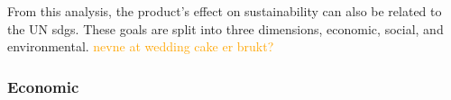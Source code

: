 From this analysis, the product's effect on sustainability can also be related to the UN \acrshort{sdg}s. These goals are split into three dimensions, economic, social, and environmental. \textcolor{orange}{nevne at wedding cake er brukt?}

\subsubsection{Economic}\label{subsubsec:discussion:product:sustainability:economic}


